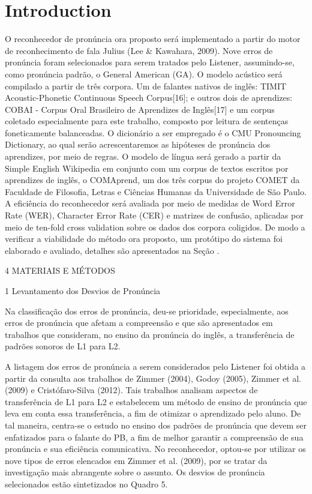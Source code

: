 \section{Introduction}

O reconhecedor de pron\'uncia ora proposto ser\'a implementado a partir do
motor de reconhecimento de fala Julius (Lee \& Kawahara, 2009). Nove
erros de pron\'uncia foram selecionados para serem tratados pelo Listener,
assumindo-se, como pron\'uncia padr\~ao, o General American (GA). O modelo
ac\'ustico ser\'a compilado a partir de tr\^es corpora. Um de falantes nativos
de ingl\^es: TIMIT Acoustic-Phonetic Continuous Speech Corpus{[}16{]}; e
outros dois de aprendizes: COBAI - Corpus Oral Brasileiro de Aprendizes
de Ingl\^es{[}17{]} e um corpus coletado especialmente para este trabalho,
composto por leitura de senten\c{c}as foneticamente balanceadas. O
dicion\'ario a ser empregado \'e o CMU Pronouncing Dictionary, ao qual ser\~ao
acrescentaremos as hip\'oteses de pron\'uncia dos aprendizes, por meio de
regras. O modelo de l\'ingua ser\'a gerado a partir da Simple English
Wikipedia em conjunto com um corpus de textos escritos por aprendizes de
ingl\^es, o COMAprend, um dos tr\^es corpus do projeto COMET da Faculdade de
Filosofia, Letras e Ci\^encias Humanas da Universidade de S\~ao Paulo. A
efici\^encia do reconhecedor ser\'a avaliada por meio de medidas de Word
Error Rate (WER), Character Error Rate (CER) e matrizes de confus\~ao,
aplicadas por meio de ten-fold cross validation sobre os dados dos
corpora coligidos. De modo a verificar a viabilidade do m\'etodo ora
proposto, um prot\'otipo do sistema foi elaborado e avaliado, detalhes s\~ao
apresentados na Se\c{c}\~ao .

4 MATERIAIS E M\'ETODOS

1 Levantamento dos Desvios de Pron\'uncia

Na classifica\c{c}\~ao dos erros de pron\'uncia, deu-se prioridade,
especialmente, aos erros de pron\'uncia que afetam a compreens\~ao e que s\~ao
apresentados em trabalhos que consideram, no ensino da pron\'uncia do
ingl\^es, a transfer\^encia de padr\~oes sonoros de L1 para L2.

A listagem dos erros de pron\'uncia a serem considerados pelo Listener foi
obtida a partir da consulta aos trabalhos de Zimmer (2004), Godoy
(2005), Zimmer et al. (2009) e Crist\'ofaro-Silva (2012). Tais trabalhos
analisam aspectos de transfer\^encia de L1 para L2 e estabelecem um m\'etodo
de ensino de pron\'uncia que leva em conta essa transfer\^encia, a fim de
otimizar o aprendizado pelo aluno. De tal maneira, centra-se o estudo no
ensino dos padr\~oes de pron\'uncia que devem ser enfatizados para o falante
do PB, a fim de melhor garantir a compreens\~ao de sua pron\'uncia e sua
efici\^encia comunicativa. No reconhecedor, optou-se por utilizar os nove
tipos de erros elencados em Zimmer et al. (2009), por se tratar da
investiga\c{c}\~ao mais abrangente sobre o assunto. Os desvios de pron\'uncia
selecionados est\~ao sintetizados no Quadro 5.

